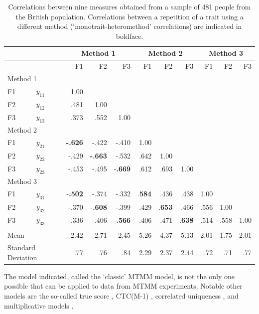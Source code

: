 \documentclass[a4paper,12pt]{article}
\begin{document}
\begin{table}[hbt]\centering\caption{Correlations between nine measures obtained from a sample of 481 people from the British population. Correlations between a repetition of a trait using a different method (`monotrait-heteromethod' correlations) are indicated in boldface.\label{tab:mtmm_cor}}
\begin{tabular}{llrrrrrrrrr}\hline
& &\multicolumn{3}{c}{Method 1} & \multicolumn{3}{c}{Method 2} & \multicolumn{3}{c}{Method  3} \\ 
\hline
&& F1 & F2 & F3 & F1 & F2 & F3 & F1 & F2 & F3 \\ 
\multicolumn{2}{l}{Method 1}\\ 
F1 &$y_{11}$ & 1.00 \\ 
F2 &$y_{12}$ & .481 & 1.00 &  \\ 
F3 &$y_{13}$ & .373 & .552 & 1.00 \\ 
\multicolumn{2}{l}{Method 2}\\ 
F1 & $y_{21}$ &\textbf{-.626} & -.422 & -.410 & 1.00 \\ 
F2 & $y_{22}$ &-.429 & \textbf{-.663} & -.532 & .642 & 1.00 \\ 
F3 & $y_{23}$ &-.453 & -.495 & -\textbf{.669} & .612 & .693 & 1.00 \\ 
\multicolumn{2}{l}{Method 3}\\
F1 & $y_{31}$ &-\textbf{.502} & -.374 & -.332 & .\textbf{584} & .436 & .438 & 1.00 \\ 
F2 & $y_{32}$ &-.370 & -\textbf{.608} & -.399 & .429 & .\textbf{653} & .466 & .556 & 1.00 \\ 
F3 & $y_{33}$ &-.336 & -.406 & -\textbf{.566} & .406 & .471 & .\textbf{638} & .514 & .558 & 1.00 \\ 
 \\ 
\multicolumn{2}{l}{Mean}  &2.42 & 2.71 & 2.45 & 5.26 & 4.37 & 5.13 & 2.01 & 1.75 & 2.01 \\ 
\multicolumn{2}{l}{Standard Deviation} & .77 & .76 & .84 & 2.29 & 2.37 & 2.44 & .72 & .71 & .77 \\ 
\hline
\end{tabular}
\end{table}

The model indicated, called the `classic' MTMM model, is not the only one possible that can be applied to data from MTMM experiments. Notable other models are the so-called true score \citep{saris_evaluation_1991},  CTC(M-1)  \citep{eid_multitrait_2000},  correlated uniqueness  \citep{kenny_empirical_1976}, and multiplicative models \citep{campbell_method_1967}. 
\end{document}
